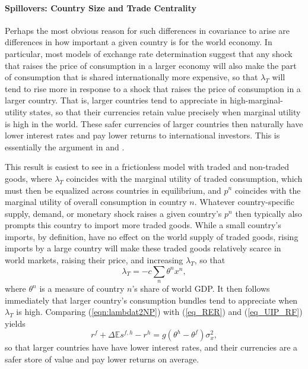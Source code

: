 \documentclass{ar-1col}
\begin{document}
\paragraph*{Spillovers: Country Size and Trade Centrality}

Perhaps the most obvious reason for such differences in covariance to arise are differences in how important a given country is for the world economy. In particular, most models of exchange rate determination suggest that any shock that raises the price of consumption in a larger economy will also make the part of consumption that is shared internationally more expensive, so that $\lambda_T$ will tend to rise more in response to a shock that raises the price of consumption in a larger country. That is, larger countries tend to appreciate in high-marginal-utility states, so that their currencies retain value precisely when marginal utility is high in the world. These safer currencies of larger countries then naturally have lower interest rates and pay lower returns to international investors. This is essentially the argument in  \citet{Martin2012} and \citet{Hassan2013}.

This result is easiest to see in a frictionless model with traded and non-traded goods, where $\lambda_T$ coincides with the marginal utility of traded consumption, which must then be equalized across countries in equilibrium, and $p^n$ coincides with the marginal utility of overall consumption in country $n$. Whatever country-specific supply, demand, or monetary shock raises a given country's $p^n$ then typically also prompts this country to import more traded goods. While a small country's imports, by definition, have no effect on the world supply of traded goods, rising imports by a large country will make these traded goods relatively scarce in world markets, raising their price, and increasing $\lambda_T$, so that  
 \begin{equation} \lambda_{T} = -c \sum_{n} \theta^n x^n,
    \label{eqn:lambdat2NP}
  \end{equation}
where $\theta^n$ is a measure of country $n$'s share of world GDP. It then follows immediately that larger country's consumption bundles tend to appreciate when $\lambda_T$ is high. Comparing (\ref{eqn:lambdat2NP}) with (\ref{eq_RER}) and (\ref{eq_UIP_RF}) yields  
\begin{equation}
  r^{f} + \Delta \mathbb{E} s^{f, h} - r^{h}
  =g\left(\theta^h - \theta^f\right) \sigma_x^2,
  \label{eq_FF_UIP}
\end{equation}
  so that larger countries have have lower interest rates, and their currencies are a safer store of value and pay lower returns on average.
  
\end{document}
